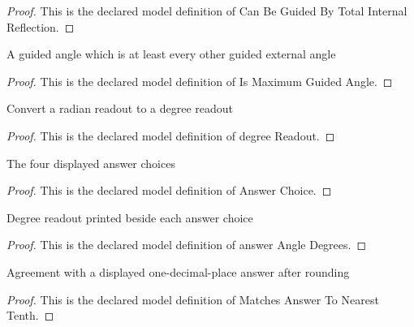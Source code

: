 \begin{proof}
  This is the declared model definition of Can Be Guided By Total Internal Reflection.
\end{proof}
\begin{definition}
  \label{def:physics:phyx-mini-0010:phyxminiproblems-problemphyxmini0010-ismaximumguidedangle}
  A guided angle which is at least every other guided external angle
\end{definition}
\begin{proof}
  This is the declared model definition of Is Maximum Guided Angle.
\end{proof}
\begin{definition}
  \label{def:physics:phyx-mini-0010:phyxminiproblems-problemphyxmini0010-degreereadout}
  Convert a radian readout to a degree readout
\end{definition}
\begin{proof}
  This is the declared model definition of degree Readout.
\end{proof}
\begin{definition}
  \label{def:physics:phyx-mini-0010:phyxminiproblems-problemphyxmini0010-answerchoice}
  The four displayed answer choices
\end{definition}
\begin{proof}
  This is the declared model definition of Answer Choice.
\end{proof}
\begin{definition}
  \label{def:physics:phyx-mini-0010:phyxminiproblems-problemphyxmini0010-answerangledegrees}
  Degree readout printed beside each answer choice
\end{definition}
\begin{proof}
  This is the declared model definition of answer Angle Degrees.
\end{proof}
\begin{definition}
  \label{def:physics:phyx-mini-0010:phyxminiproblems-problemphyxmini0010-matchesanswertonearesttenth}
  Agreement with a displayed one-decimal-place answer after rounding
\end{definition}
\begin{proof}
  This is the declared model definition of Matches Answer To Nearest Tenth.
\end{proof}
